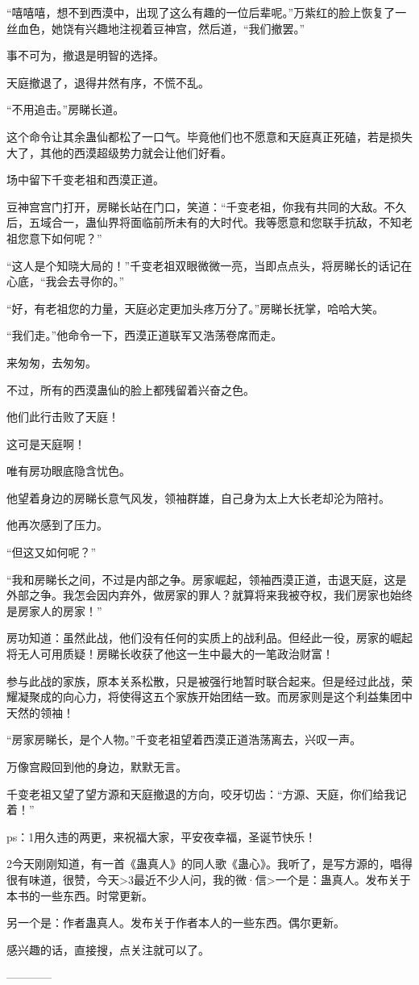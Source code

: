 \begin{this_body}
“嘻嘻嘻，想不到西漠中，出现了这么有趣的一位后辈呢。”万紫红的脸上恢复了一丝血色，她饶有兴趣地注视着豆神宫，然后道，“我们撤罢。”

事不可为，撤退是明智的选择。

天庭撤退了，退得井然有序，不慌不乱。

“不用追击。”房睇长道。

这个命令让其余蛊仙都松了一口气。毕竟他们也不愿意和天庭真正死磕，若是损失大了，其他的西漠超级势力就会让他们好看。

场中留下千变老祖和西漠正道。

豆神宫宫门打开，房睇长站在门口，笑道：“千变老祖，你我有共同的大敌。不久后，五域合一，蛊仙界将面临前所未有的大时代。我等愿意和您联手抗敌，不知老祖您意下如何呢？”

“这人是个知晓大局的！”千变老祖双眼微微一亮，当即点点头，将房睇长的话记在心底，“我会去寻你的。”

“好，有老祖您的力量，天庭必定更加头疼万分了。”房睇长抚掌，哈哈大笑。

“我们走。”他命令一下，西漠正道联军又浩荡卷席而走。

来匆匆，去匆匆。

不过，所有的西漠蛊仙的脸上都残留着兴奋之色。

他们此行击败了天庭！

这可是天庭啊！

唯有房功眼底隐含忧色。

他望着身边的房睇长意气风发，领袖群雄，自己身为太上大长老却沦为陪衬。

他再次感到了压力。

“但这又如何呢？”

“我和房睇长之间，不过是内部之争。房家崛起，领袖西漠正道，击退天庭，这是外部之争。我怎会因内弃外，做房家的罪人？就算将来我被夺权，我们房家也始终是房家人的房家！”

房功知道：虽然此战，他们没有任何的实质上的战利品。但经此一役，房家的崛起将无人可用质疑！房睇长收获了他这一生中最大的一笔政治财富！

参与此战的家族，原本关系松散，只是被强行地暂时联合起来。但是经过此战，荣耀凝聚成的向心力，将使得这五个家族开始团结一致。而房家则是这个利益集团中天然的领袖！

“房家房睇长，是个人物。”千变老祖望着西漠正道浩荡离去，兴叹一声。

万像宫殿回到他的身边，默默无言。

千变老祖又望了望方源和天庭撤退的方向，咬牙切齿：“方源、天庭，你们给我记着！”

ps：1用久违的两更，来祝福大家，平安夜幸福，圣诞节快乐！

2今天刚刚知道，有一首《蛊真人》的同人歌《蛊心》。我听了，是写方源的，唱得很有味道，很赞，今天>3最近不少人问，我的微·信>一个是：蛊真人。发布关于本书的一些东西。时常更新。

另一个是：作者蛊真人。发布关于作者本人的一些东西。偶尔更新。

感兴趣的话，直接搜，点关注就可以了。

------------

\end{this_body}

